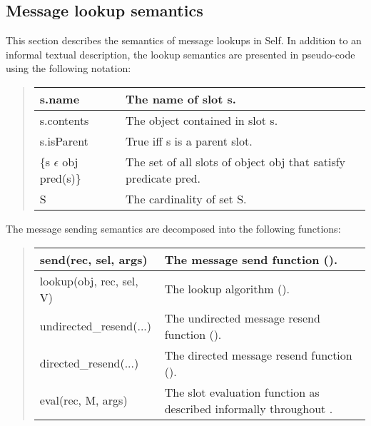\documentclass[letterpaper,10pt,english]{sphinxmanual}
\begin{document}
\subsection{Message lookup semantics}
\label{\detokenize{langref:message-lookup-semantics}}\label{\detokenize{langref:pp-langref-message-lookup}}\label{\detokenize{langref:index-54}}
This section describes the semantics of message lookups in Self. In addition to an informal textual description, the lookup semantics are presented in pseudo-code using the following notation:
\begin{quote}

\noindent\begin{tabulary}{\linewidth}{|L|L|}
\hline

s.name
&
The name of slot s.
\\
\hline
s.contents
&
The object contained in slot s.
\\
\hline
s.isParent
&
True iff s is a parent slot.
\\
\hline
\{s \(\epsilon\) obj \textbar{} pred(s)\}
&
The set of all slots of object obj that satisfy predicate pred.
\\
\hline
\textbar{} S \textbar{}
&
The cardinality of set S.
\\
\hline\end{tabulary}

\end{quote}

The message sending semantics are decomposed into the following functions:
\begin{quote}

\noindent\begin{tabulary}{\linewidth}{|L|L|}
\hline

send(rec, sel, args)
&
The message send function ({\hyperref[\detokenize{langref:pp-mesage-send}]{}}).
\\
\hline
lookup(obj, rec, sel, V)
&
The lookup algorithm ({\hyperref[\detokenize{langref:pp-lookup-algorithm}]{}}).
\\
\hline
undirected\_resend(...)
&
The undirected message resend function ({\hyperref[\detokenize{langref:pp-undirected-resend}]{}}).
\\
\hline
directed\_resend(...)
&
The directed message resend function ({\hyperref[\detokenize{langref:pp-directed-resend}]{}}).
\\
\hline
eval(rec, M, args)
&
The slot evaluation function as described informally throughout {\hyperref[\detokenize{langref:pp-langref-code}]{}}.
\\
\hline\end{tabulary}

\end{quote}
\end{document}
